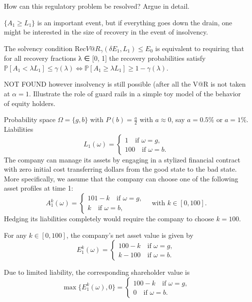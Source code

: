 How can this regulatory problem be resolved? Argue in detail.

\( \{A_1 \geq L_{1}\} \) is an important event, but if everything goes down the drain,
one might be interested in the size of recovery in the event of insolvency.

The solvency condition \( \text{Rec}V@R_{\gamma}(\delta E_1, L_1) \leq E_0 \)
is equivalent to requiring that for all recovery fractions λ ∈ [0, 1] the recovery probabilities satisfy
\( \mathbb{P}[A_1 < \lambda L_1] \leq \gamma(\lambda) \iff \mathbb{P}[A_1 \geq \lambda L_1] \geq 1 - \gamma(\lambda) \).

NOT FOUND
 however insolvency is still possible (after all the V@R is not taken at \( \alpha = 1 \).
Illustrate the role of guard rails in a simple toy model of the behavior of equity
holders.

Probability space \(\Omega = \{g, b\}\) with \(P(b) = \frac{a}{2}\) with \(a \approx 0\), say \(a = 0.5\%\) or \(a = 1\%\).
Liabilities
\[L_1(\omega) = \begin{cases} 1 \quad \text{if } \omega = g, \\ 100 \quad \text{if } \omega = b. \end{cases} \]
The company can manage its assets by engaging in a stylized financial contract with zero initial cost transferring dollars from the good state to the bad state.
More specifically, we assume that the company can choose one of the following asset profiles at time 1:
\[A_1^k(\omega) = \begin{cases} 101-k \quad \text{if } \omega = g, \\ k \quad \text{if } \omega = b, \end{cases} \quad \text{with } k \in [0, 100]. \]
Hedging its liabilities completely would require the company to choose \(k = 100\).

For any \(k \in [0, 100]\), the company's net asset value is given by
\[E_1^k(\omega) = \begin{cases} 100-k \quad \text{if } \omega = g, \\ k-100 \quad \text{if } \omega = b. \end{cases} \]

Due to limited liability, the corresponding shareholder value is
\[\max\{E_1^k(\omega), 0\} = \begin{cases} 100-k \quad \text{if } \omega = g, \\ 0 \quad \text{if } \omega = b. \end{cases} \]

